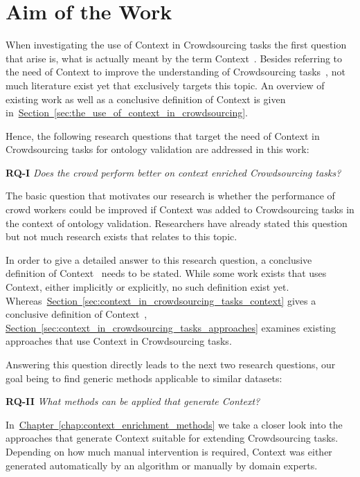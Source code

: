 \section{Aim of the Work}
When investigating the use of Context in Crowdsourcing tasks the first question that arise is, what is actually
meant by the term \guillemotright Context\guillemotleft~. Besides referring to the need of Context to improve the understanding
of Crowdsourcing tasks~\cite{sarasua2015crowdsourcing}, not much literature exist yet that exclusively targets this topic. An overview
of existing work as well as a conclusive definition of Context is given in~\hyperref[sec:the_use_of_context_in_crowdsourcing]{Section~\ref*{sec:the_use_of_context_in_crowdsourcing}}.

Hence, the following research questions that target the need of Context in Crowdsourcing tasks for ontology validation are addressed in this work:

\textbf{RQ-I} \emph{Does the crowd perform better on context enriched Crowdsourcing tasks?}

The basic question that motivates our research is whether the performance of crowd workers could be improved if Context was added
to Crowdsourcing tasks in the context of ontology validation. Researchers have already stated this question~\cite{sarasua2015crowdsourcing} but not much research exists that relates to this topic. 

In order to give a detailed answer to this research question, a conclusive definition of \guillemotright Context\guillemotleft~ needs to be stated. While some work exists that uses Context, either implicitly or explicitly, no such definition exist yet. Whereas~\hyperref[sec:context_in_crowdsourcing_tasks_context]{Section~\ref*{sec:context_in_crowdsourcing_tasks_context}} gives a conclusive definition of \guillemotright Context\guillemotleft~, \hyperref[sec:context_in_crowdsourcing_tasks_approaches]{Section~\ref*{sec:context_in_crowdsourcing_tasks_approaches}} examines existing approaches that use Context in Crowdsourcing tasks. 

Answering this question directly leads to the next two research questions, our goal being to find generic methods applicable to similar
datasets:

\textbf{RQ-II} \emph{What methods can be applied that generate Context?}

In~\hyperref[chap:context_enrichment_methods]{Chapter~\ref*{chap:context_enrichment_methods}} we take a closer look into the approaches that generate Context suitable for extending Crowdsourcing tasks. Depending on how much manual intervention is required, Context was either generated automatically by an algorithm or manually by domain experts. 

